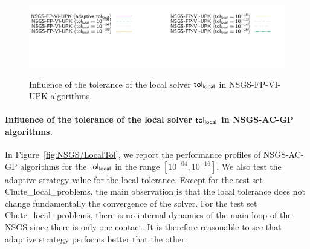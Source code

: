 \begin{figure}
\\
{\includegraphics[width=\legendwidth]{../figure/NSGS/LocalTol/VI/1.0e-08/50/time/profile-Chain_legend.pdf}} 
\caption{Influence of the tolerance of the local solver $\sf tol_{local}$ in {\sf NSGS-FP-VI-UPK} algorithms.}
 \label{fig:NSGS/LocalTol/VI}
\end{figure}

\paragraph{Influence of the tolerance of the local solver $\sf tol_{local}$ in {\sf NSGS-AC-GP} algorithms.}
In Figure~\ref{fig:NSGS/LocalTol},  we report the performance profiles of {\sf NSGS-AC-GP} algorithms for the $\sf tol_{local}$ in the range $[10^{-04}, 10^{-16}]$. We also test the  adaptive strategy value for the local tolerance. Except for the test set Chute\_local\_problems,  the main observation is that the local tolerance does not change fundamentally the convergence of the solver. For the test set Chute\_local\_problems, there is no internal dynamics of the main loop of the {\sf NSGS} since there is only one contact. It is therefore reasonable to see that adaptive strategy performs better that the other.



